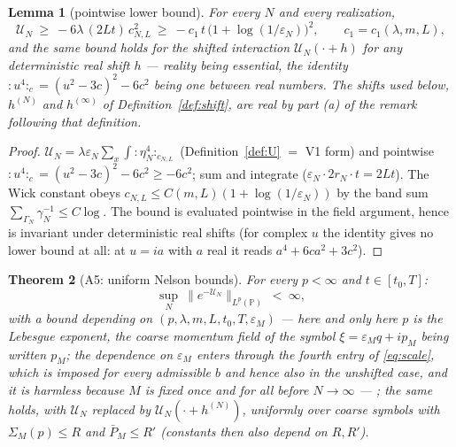 \documentclass[11pt,a4paper]{article}
\theoremstyle{plain}
\newtheorem{theorem}{Theorem}[section]
\newtheorem{lemma}[theorem]{Lemma}
\theoremstyle{definition}
\newcommand{\PP}{\mathbb{P}}
\newcommand{\eps}{\varepsilon}
\newcommand{\U}{\mathcal U}
\begin{document}
\begin{lemma}[pointwise lower bound]\label{lem:lower}
For every $N$ and every realization,
\begin{equation}
 \U_N\ \ge\ -6\lambda\,(2Lt)\,c_{N,L}^2
 \ \ge\ -c_1\,t\,\bigl(1+\log(1/\eps_N)\bigr)^2,
 \qquad c_1=c_1(\lambda,m,L),
 \label{eq:lower}
\end{equation}
and the same bound holds for the shifted interaction
$\U_N(\cdot+h)$ for any deterministic \emph{real} shift $h$ --- reality being
essential, the identity ${:}u^4{:}_c=(u^2-3c)^2-6c^2$ being one between real numbers.
The shifts used below, $h^{(N)}$ and $h^{(\infty)}$ of Definition~\ref{def:shift},
are real by part (a) of the remark following that definition.
\end{lemma}

\begin{proof}
$\U_N=\lambda\eps_N\sum_x\int{:}\eta_N^4{:}_{c_{N,L}}$ (Definition~\ref{def:U}
$=$ V1 form) and pointwise ${:}u^4{:}_c=(u^2-3c)^2-6c^2\ge-6c^2$; sum and
integrate ($\eps_N\cdot2r_N\cdot t=2Lt$). The Wick constant obeys
$c_{N,L}\le C(m,L)(1+\log(1/\eps_N))$ by the band sum
$\sum_{\Gamma_N}\gamma_N^{-1}\le C\log$. The bound is evaluated pointwise in
the field argument, hence is invariant under deterministic real shifts (for complex
$u$ the identity gives no lower bound at all: at $u=ia$ with $a$ real it reads
$a^4+6ca^2+3c^2$).
\end{proof}

\begin{theorem}[A5: uniform Nelson bounds]\label{thm:A5}
For every $p<\infty$ and $t\in[t_0,T]$:
\begin{equation}
 \sup_{N}\ \bigl\|e^{-\U_N}\bigr\|_{L^p(\PP)}\ <\ \infty ,
 \label{eq:A5}
\end{equation}
with a bound depending on $(p,\lambda,m,L,t_0,T,\eps_M)$ --- here and only here $p$ is
the Lebesgue exponent, the coarse momentum field of the symbol $\xi=\eps_Mq+ip_M$
being written $p_M$; the dependence on $\eps_M$ enters through the fourth entry of
\eqref{eq:scale}, which is imposed for every admissible $b$ and hence also in the
unshifted case, and it is harmless because $M$ is fixed once and for all before
$N\to\infty$ --- ; the same holds, with
$\U_N$ replaced by $\U_N(\cdot+h^{(N)})$, uniformly over coarse symbols
with $\Sigma_M(p)\le R$ and $\bar P_M\le R'$ (constants then also depend on
$R,R'$).
\end{theorem}
\end{document}
